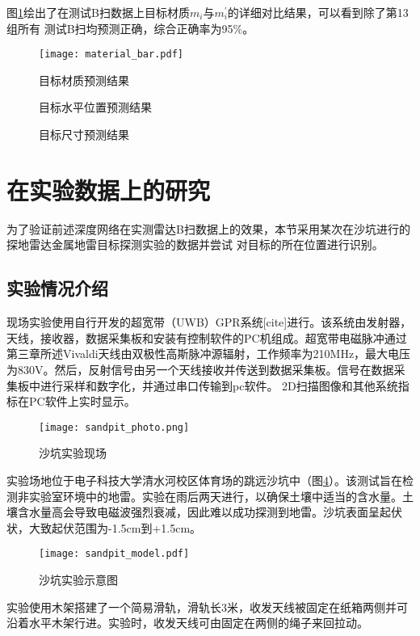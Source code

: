 图\ref{material_bar}绘出了在测试B扫数据上目标材质$m_i$与$m_i^{\prime}$的详细对比结果，可以看到除了第13组所有
测试B扫均预测正确，综合正确率为95\%。
\begin{figure}[htbp]
	\texttt{[image: material\_bar.pdf]}
	\caption[]{目标材质预测结果}
	\label{material_bar}
\end{figure}
\begin{figure}[htbp]
	\caption{目标水平位置预测结果}
	\label{position_bar}
\end{figure}
\begin{figure}[htbp]
	\caption{目标尺寸预测结果}
	\label{size_bar}
\end{figure}
\section{在实验数据上的研究}
为了验证前述深度网络在实测雷达B扫数据上的效果，本节采用某次在沙坑进行的探地雷达金属地雷目标探测实验的数据并尝试
对目标的所在位置进行识别。
\subsection{实验情况介绍}
现场实验使用自行开发的超宽带（UWB）GPR系统[cite]进行。该系统由发射器，天线，接收器，数据采集板和安装有控制软件的PC机组成。超宽带电磁脉冲通过第三章所述Vivaldi天线由双极性高斯脉冲源辐射，工作频率为210MHz，最大电压为830V。然后，反射信号由另一个天线接收并传送到数据采集板。信号在数据采集板中进行采样和数字化，并通过串口传输到pc软件。 2D扫描图像和其他系统指标在PC软件上实时显示。
\begin{figure}[htbp]
	\texttt{[image: sandpit\_photo.png]}
	\caption[]{沙坑实验现场}
	\label{sandpit_photo}
\end{figure}

实验场地位于电子科技大学清水河校区体育场的跳远沙坑中（图\ref{sandpit_photo}）。该测试旨在检测非实验室环境中的地雷。实验在雨后两天进行，以确保土壤中适当的含水量。土壤含水量高会导致电磁波强烈衰减，因此难以成功探测到地雷。沙坑表面呈起伏状，大致起伏范围为-1.5cm到+1.5cm。
\begin{figure}[htbp]
	\texttt{[image: sandpit\_model.pdf]}
	\caption[]{沙坑实验示意图}
	\label{sandpit_model}
\end{figure}

实验使用木架搭建了一个简易滑轨，滑轨长3米，收发天线被固定在纸箱两侧并可沿着水平木架行进。实验时，收发天线可由固定在两侧的绳子来回拉动。

